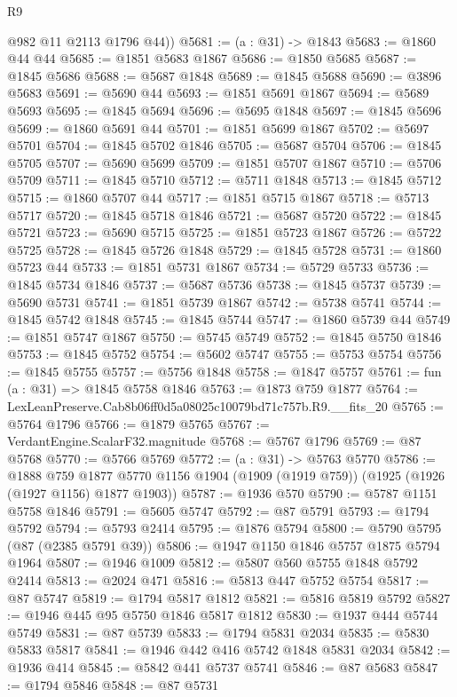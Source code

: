 \begin{lexlean}{R9}
\begin{coremodule}
        @982
        @11
        @2113
        @1796
        @44))
@5681 := (a : @31) -> @1843
@5683 := @1860 @44 @44
@5685 := @1851 @5683 @1867
@5686 := @1850 @5685
@5687 := @1845 @5686
@5688 := @5687 @1848
@5689 := @1845 @5688
@5690 := @3896 @5683
@5691 := @5690 @44
@5693 := @1851 @5691 @1867
@5694 := @5689 @5693
@5695 := @1845 @5694
@5696 := @5695 @1848
@5697 := @1845 @5696
@5699 := @1860 @5691 @44
@5701 := @1851 @5699 @1867
@5702 := @5697 @5701
@5704 := @1845 @5702 @1846
@5705 := @5687 @5704
@5706 := @1845 @5705
@5707 := @5690 @5699
@5709 := @1851 @5707 @1867
@5710 := @5706 @5709
@5711 := @1845 @5710
@5712 := @5711 @1848
@5713 := @1845 @5712
@5715 := @1860 @5707 @44
@5717 := @1851 @5715 @1867
@5718 := @5713 @5717
@5720 := @1845 @5718 @1846
@5721 := @5687 @5720
@5722 := @1845 @5721
@5723 := @5690 @5715
@5725 := @1851 @5723 @1867
@5726 := @5722 @5725
@5728 := @1845 @5726 @1848
@5729 := @1845 @5728
@5731 := @1860 @5723 @44
@5733 := @1851 @5731 @1867
@5734 := @5729 @5733
@5736 := @1845 @5734 @1846
@5737 := @5687 @5736
@5738 := @1845 @5737
@5739 := @5690 @5731
@5741 := @1851 @5739 @1867
@5742 := @5738 @5741
@5744 := @1845 @5742 @1848
@5745 := @1845 @5744
@5747 := @1860 @5739 @44
@5749 := @1851 @5747 @1867
@5750 := @5745 @5749
@5752 := @1845 @5750 @1846
@5753 := @1845 @5752
@5754 := @5602 @5747
@5755 := @5753 @5754
@5756 := @1845 @5755
@5757 := @5756 @1848
@5758 := @1847 @5757
@5761 := fun (a : @31) => @1845 @5758 @1846
@5763 := @1873 @759 @1877
@5764 := LexLeanPreserve.Cab8b06ff0d5a08025c10079bd71c757b.R9.__fits_20
@5765 := @5764 @1796
@5766 := @1879 @5765
@5767 := VerdantEngine.ScalarF32.magnitude
@5768 := @5767 @1796
@5769 := @87 @5768
@5770 := @5766 @5769
@5772 := (a : @31) -> @5763 @5770
@5786 := @1888
    @759
    @1877
    @5770
    @1156
    @1904
    (@1909 (@1919 @759))
    (@1925 (@1926 (@1927 @1156) @1877 @1903))
@5787 := @1936 @570
@5790 := @5787 @1151 @5758 @1846
@5791 := @5605 @5747
@5792 := @87 @5791
@5793 := @1794 @5792
@5794 := @5793 @2414
@5795 := @1876 @5794
@5800 := @5790 @5795 (@87 (@2385 @5791 @39))
@5806 := @1947 @1150 @1846 @5757 @1875 @5794 @1964
@5807 := @1946 @1009
@5812 := @5807 @560 @5755 @1848 @5792 @2414
@5813 := @2024 @471
@5816 := @5813 @447 @5752 @5754
@5817 := @87 @5747
@5819 := @1794 @5817 @1812
@5821 := @5816 @5819 @5792
@5827 := @1946 @445 @95 @5750 @1846 @5817 @1812
@5830 := @1937 @444 @5744 @5749
@5831 := @87 @5739
@5833 := @1794 @5831 @2034
@5835 := @5830 @5833 @5817
@5841 := @1946 @442 @416 @5742 @1848 @5831 @2034
@5842 := @1936 @414
@5845 := @5842 @441 @5737 @5741
@5846 := @87 @5683
@5847 := @1794 @5846
@5848 := @87 @5731

\end{coremodule}
\end{lexlean}
